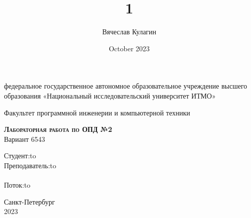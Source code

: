 \documentclass[12pt]{article}
\title{1}
\author{Вячеслав Кулагин}
\date{October 2023}
\begin{document}
\begin{titlepage}
\newpage

\begin{center}
федеральное государственное автономное образовательное
учреждение
высшего образования «Национальный исследовательский
университет ИТМО»\\
\end{center}

\vspace{8em}

\begin{center}
\Large Факультет программной инженерии и компьютерной техники \\ 
\end{center}

\vspace{2em}

\begin{center}
\textsc{\textbf{Лабораторная работа по ОПД №2}}\\
\Large Вариант 6543
\end{center}

\vspace{18em}



\newbox{\lbox}
\newlength{\maxl}
\setlength{\maxl}{\wd\lbox}
\hfill\parbox{11cm}{
\hspace*{5cm}\hspace*{-5cm}Студент:\hfill\hbox to\\
\hspace*{5cm}\hspace*{-5cm}Преподаватель:\hfill\hbox to\\
\\
\hspace*{5cm}\hspace*{-5cm}Поток:\hfill\hbox to\\
}


\vspace{\fill}

\begin{center}
Санкт-Петербург \\2023
\end{center}
\end{titlepage}
\end{document}
